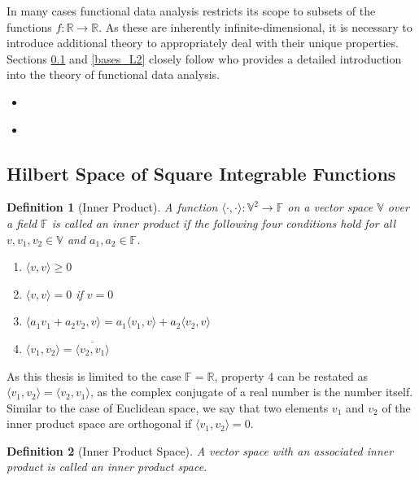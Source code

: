 \documentclass[12pt, a4paper]{article}
\theoremstyle{MAstyle} \newtheorem{assumption}{Assumption}[section]
\theoremstyle{MAstyle} \newtheorem{definition}{Definition}[section]
\begin{document}
		In many cases functional data analysis restricts its scope to subsets of the functions $f:\mathbb{R} \rightarrow \mathbb{R}$.
		As these are inherently infinite-dimensional, it is necessary to introduce additional theory to appropriately deal with their unique properties. Sections \ref{Square_Integrable_Functions} and \ref{bases_L2} closely follow \cite{hsing_theoretical_2015} who provides a detailed introduction into the theory of functional data analysis.
		
		\begin{itemize}
			\item \cite{ramsay_functional_2005}
			\item \cite{kokoszka_introduction_2021}
		\end{itemize}
	
		\subsection{Hilbert Space of Square Integrable Functions}\label{Square_Integrable_Functions}
			\begin{definition}[Inner Product]
				A function $\langle \cdot , \cdot \rangle : \mathbb{V}^2 \rightarrow \mathbb{F}$ on a vector space $\mathbb{V}$ over a field $\mathbb{F}$ is called an inner product if the following four conditions hold for all $v, v_1, v_2 \in \mathbb{V}$ and $a_1, a_2 \in \mathbb{F}$.
				\begin{multicols}{2}
					\begin{enumerate}
						\item $\langle v,v \rangle \geq 0$
						\item $\langle v,v \rangle = 0$ if $v = 0$
						\item $\langle a_1 v_1 + a_2 v_2, v \rangle = a_1 \langle v_1, v \rangle + a_2 \langle v_2, v \rangle$
						\item $\langle v_1, v_2 \rangle = \overline{\langle v_2, v_1 \rangle}$
					\end{enumerate}
				\end{multicols}
			\end{definition}
			As this thesis is limited to the case $\mathbb{F} = \mathbb{R}$, property 4 can be restated as $\langle v_1, v_2 \rangle = \langle v_2, v_1 \rangle$, as the complex conjugate of a real number is the number itself. Similar to the case of Euclidean space, we say that two elements $v_1$ and $v_2$ of the inner product space are orthogonal if $\langle v_1, v_2 \rangle = 0$.
			
			\begin{definition}[Inner Product Space]
				A vector space with an associated inner product is called an inner product space.
			\end{definition}
\end{document}
